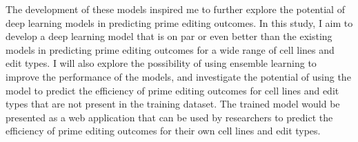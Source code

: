 The development of these models inspired me to further explore the potential of deep learning models in predicting prime editing outcomes. In this study, I aim to develop a deep learning model that is on par or even better than the existing models in predicting prime editing outcomes for a wide range of cell lines and edit types. I will also explore the possibility of using ensemble learning to improve the performance of the models, and investigate the potential of using the model to predict the efficiency of prime editing outcomes for cell lines and edit types that are not present in the training dataset. The trained model would be presented as a web application that can be used by researchers to predict the efficiency of prime editing outcomes for their own cell lines and edit types.